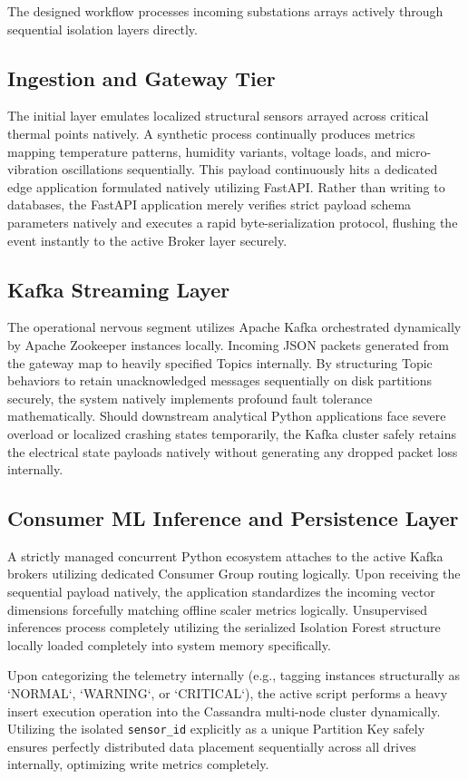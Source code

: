 \documentclass[12pt, a4paper]{article}
\begin{document}
The designed workflow processes incoming substations arrays actively through sequential isolation layers directly.

\subsection{Ingestion and Gateway Tier}
The initial layer emulates localized structural sensors arrayed across critical thermal points natively. A synthetic process continually produces metrics mapping temperature patterns, humidity variants, voltage loads, and micro-vibration oscillations sequentially. This payload continuously hits a dedicated edge application formulated natively utilizing FastAPI. Rather than writing to databases, the FastAPI application merely verifies strict payload schema parameters natively and executes a rapid byte-serialization protocol, flushing the event instantly to the active Broker layer securely.

\subsection{Kafka Streaming Layer}
The operational nervous segment utilizes Apache Kafka orchestrated dynamically by Apache Zookeeper instances locally. Incoming JSON packets generated from the gateway map to heavily specified Topics internally. By structuring Topic behaviors to retain unacknowledged messages sequentially on disk partitions securely, the system natively implements profound fault tolerance mathematically. Should downstream analytical Python applications face severe overload or localized crashing states temporarily, the Kafka cluster safely retains the electrical state payloads natively without generating any dropped packet loss internally. 

\subsection{Consumer ML Inference and Persistence Layer}
A strictly managed concurrent Python ecosystem attaches to the active Kafka brokers utilizing dedicated Consumer Group routing logically. Upon receiving the sequential payload natively, the application standardizes the incoming vector dimensions forcefully matching offline scaler metrics logically. Unsupervised inferences process completely utilizing the serialized Isolation Forest structure locally loaded completely into system memory specifically. 

Upon categorizing the telemetry internally (e.g., tagging instances structurally as `NORMAL`, `WARNING`, or `CRITICAL`), the active script performs a heavy insert execution operation into the Cassandra multi-node cluster dynamically. Utilizing the isolated \texttt{sensor\_id} explicitly as a unique Partition Key safely ensures perfectly distributed data placement sequentially across all drives internally, optimizing write metrics completely. 
\end{document}
